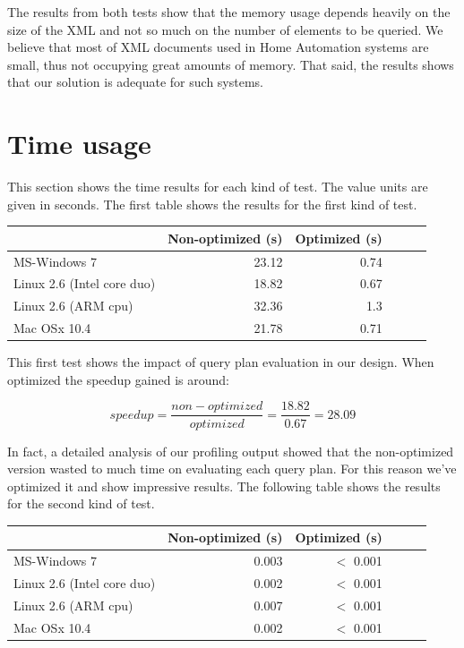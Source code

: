 \documentclass[a4paper]{report}
\begin{document}
	The results from both tests show that the memory usage depends heavily on the size of the XML and not so much on the number of elements to be queried. We believe that most of XML documents used in Home 
	Automation systems are small, thus not occupying great amounts of memory. That said, the results shows that our solution is adequate for such systems.
	
\section{Time usage}\label{sec:tprof}
	This section shows the time results for each kind of test. The value units are given in seconds. The first table shows the results for the first kind of test.
	
	\begin{center}
  			\begin{tabular}{ | l | r | r | r | r | r | }
			    \hline
				       	       		     			 & Non-optimized (s) & Optimized (s)\\ \hline
				    MS-Windows 7   			&  23.12  & 0.74  \\ \hline
				    Linux 2.6 (Intel core duo) 	&  18.82  & 0.67  \\ \hline
				    Linux 2.6 (ARM cpu)   		&  32.36  & 1.3 \\ \hline
				    Mac OSx 10.4   			&  21.78  & 0.71 \\ 
			    \hline
			\end{tabular}		   
	\end{center}

	This first test shows the impact of query plan evaluation in our design. When optimized the speedup gained is around:
	
		$$speedup = \frac{non-optimized}{optimized} = \frac{18.82}{0.67} = 28.09$$

	In fact, a detailed analysis of our profiling output showed that the non-optimized version wasted to much time on evaluating each query plan. For this reason we've optimized it and show impressive results. The following 
	table shows the results for the second kind of test.
	
	\begin{center}
  			\begin{tabular}{ | l | r | r | r | r | r | }
			    \hline
				       	       		     			 & Non-optimized (s) & Optimized (s)\\ \hline
				    MS-Windows 7   			&  0.003  & $<$ 0.001  \\ \hline
				    Linux 2.6 (Intel core duo) 	&  0.002  & $<$ 0.001  \\ \hline
				    Linux 2.6 (ARM cpu)   		&  0.007  & $<$ 0.001 \\ \hline
				    Mac OSx 10.4   			&  0.002  & $<$ 0.001 \\ 
			    \hline
			\end{tabular}		   
	\end{center}
	
\end{document}
